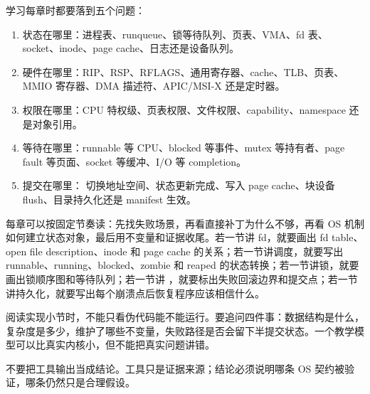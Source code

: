学习每章时都要落到五个问题：

\begin{enumerate}
\tightlist
\item 状态在哪里：进程表、runqueue、锁等待队列、页表、VMA、fd 表、socket、inode、page cache、日志还是设备队列。
\item 硬件在哪里：RIP、RSP、RFLAGS、通用寄存器、cache、TLB、页表、MMIO 寄存器、DMA 描述符、APIC/MSI-X 还是定时器。
\item 权限在哪里：CPU 特权级、页表权限、文件权限、capability、namespace 还是对象引用。
\item 等待在哪里：runnable 等 CPU、blocked 等事件、mutex 等持有者、page fault 等页面、socket 等缓冲、I/O 等 completion。
\item 提交在哪里： 切换地址空间、状态更新完成、写入 page cache、块设备 flush、目录持久化还是 manifest 生效。
\end{enumerate}

每章可以按固定节奏读：先找失败场景，再看直接补丁为什么不够，再看 OS 机制如何建立状态对象，最后用不变量和证据收尾。若一节讲 fd，就要画出 fd table、open file description、inode 和 page cache 的关系；若一节讲调度，就要写出 runnable、running、blocked、zombie 和 reaped 的状态转换；若一节讲锁，就要画出锁顺序图和等待队列；若一节讲 ，就要标出失败回滚边界和提交点；若一节讲持久化，就要写出每个崩溃点后恢复程序应该相信什么。

阅读实现小节时，不能只看伪代码能不能运行。要追问四件事：数据结构是什么，复杂度是多少，维护了哪些不变量，失败路径是否会留下半提交状态。一个教学模型可以比真实内核小，但不能把真实问题讲错。

\begin{warningbox}
不要把工具输出当成结论。工具只是证据来源；结论必须说明哪条 OS 契约被验证，哪条仍然只是合理假设。
\end{warningbox}
